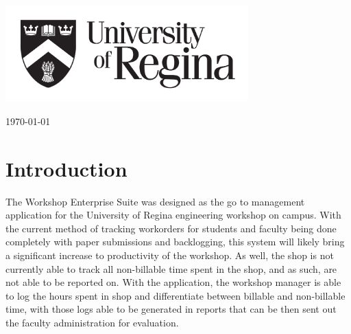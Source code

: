 \begin{titlepage}
	
	\vfill\vfill\vfill\vfill
	\includegraphics[width=0.7\textwidth]{UR.png}\\[2cm] %
	 

	
	\vfill\vfill\vfill %
	
	{\large\today} %
	
	
	\vfill %
	
\end{titlepage}



\newpage 
\tableofcontents


\newpage
\section{Introduction}
The Workshop Enterprise Suite was designed as the go to management application for the University of Regina engineering workshop on campus. With the current method of tracking workorders for students and faculty being done completely with paper submissions and backlogging, this system will likely bring a significant increase to productivity of the workshop. As well, the shop is not currently able to track all non-billable time spent in the shop, and as such, are not able to be reported on. With the application, the workshop manager is able to log the hours spent in shop and differentiate between billable and non-billable time, with those logs able to be generated in reports that can be then sent out the faculty administration for evaluation. 

